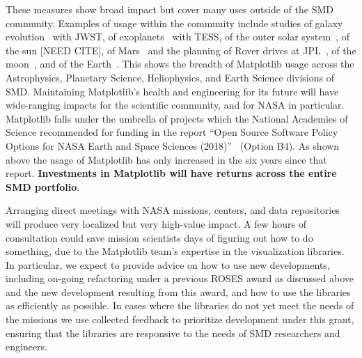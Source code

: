 \documentclass[12pt]{article}
\numberwithin{page}{section}
\begin{document}
These measures show broad impact but cover many uses outside of the
SMD community.  Examples of usage within the community include
studies of galaxy evolution~\cite{2022ApJ...940L..14N} with JWST,
of exoplanets~\cite{2020AJ....160..116G, Barclay_2018,2019AJ....158...27L} with TESS,
of the outer solar system~\cite{Emran_2023},
of the sun [NEED CITE],
of Mars~\cite{2022JE007697} and the planning of Rover drives at JPL~\cite{acurtis},
of the moon~\cite{NESNAS2023163},
and of the Earth~\cite{paolo_2024}.
This shows the breadth of Matplotlib usage across the Astrophysics,
Planetary Science, Heliophysics, and Earth Science divisions of SMD.
Maintaining Matplotlib's health and engineering for its future will
have wide-ranging impacts for the scientific community, and for NASA in
particular.
Matplotlib falls under the umbrella of projects which the National Academies of
Science recommended for funding in the report ``Open Source Software Policy
Options for NASA Earth and Space Sciences (2018)''~\cite{NAP25217} (Option B4).
As shown above the usage of Matplotlib has only increased in the six years since
that report.  \textbf{Investments in Matplotlib will have returns across the
  entire SMD portfolio}.


Arranging direct meetings with NASA missions, centers, and data repositories
will produce very localized but very high-value impact.  A few hours of
consultation could save mission scientists days of figuring out how to do
something, due to the Matplotlib team's expertise in the visualization
libraries.  In particular, we expect to provide advice on how to use new
developments, including on-going refactoring under a previous ROSES award as
discussed above and the new development resulting from this award, and how to
use the libraries as efficiently as possible.  In cases where the libraries do
not yet meet the needs of the missions we use collected feedback to prioritize
development under this grant, ensuring that the libraries are responsive to the
needs of SMD researchers and engineers.
\end{document}
